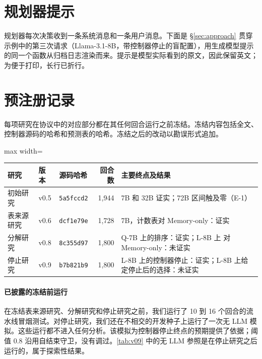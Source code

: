 \section{规划器提示}
\label{app:prompt}

规划器每次决策收到一条系统消息和一条用户消息。下面是 \S\ref{sec:approach} 贯穿示例中的第三次请求（Llama-3.1-8B，带控制器停止的盲配置），用生成模型提示的同一个函数从归档日志渲染而来。提示是模型实际看到的原文，因此保留英文；为便于打印，长行已折行。



\section{预注册记录}
\label{app:prereg}

每项研究在协议中的对应部分都在其任何回合运行之前冻结。冻结内容包括全文、控制器源码的哈希和预测表的哈希。冻结之后的改动以勘误形式追加。

\begin{table}[t]
  \centering\small
  \begin{adjustbox}{max width=\textwidth}
  \begin{tabular}{lllrl}
    \toprule
    研究 & 版本 & 源码哈希 & 回合数 & 主要终点及结果 \\
    \midrule
    初始研究 & v0.5 & \texttt{5a5fccd2} & 1{,}944 & 7B 和 32B 证实；72B 区间触及零（E-1） \\
    表来源研究 & v0.6 & \texttt{dcf1e79e} & 1{,}728 & 7B，计数表对 Memory-only：证实 \\
    分解研究 & v0.8 & \texttt{8c355d97} & 1{,}800 & Q-7B 上的排序：证实；L-8B 上 \hesp{} 对 Memory-only：未证实 \\
    停止研究 & v0.9 & \texttt{b7b821b9} & 1{,}800 & L-8B 上的控制器停止：证实；L-8B 上给定停止后的选择：未证实 \\
    \bottomrule
  \end{tabular}
  \end{adjustbox}
\end{table}

\paragraph{已披露的冻结前运行} 在冻结表来源研究、分解研究和停止研究之前，我们运行了 10 到 16 个回合的流水线冒烟测试。对停止研究，我们还在不相交的开发种子上运行了一次无 LLM 模拟。这些运行都不进入任何分析。该模拟为控制器停止终点的预期提供了依据；阈值 0.8 沿用自结束守卫，没有调过。\cref{tab:v09} 中的无 LLM 参照是在停止研究之后运行的，属于探索性结果。


